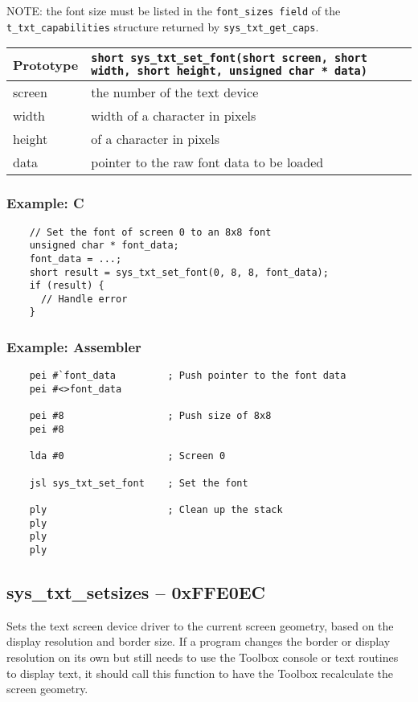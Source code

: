 NOTE: the font size must be listed in the \verb+font_sizes field+ of the \verb+t_txt_capabilities+ structure returned by \verb+sys_txt_get_caps+.

\bigskip

\begin{tabular}{|l||l|} \hline
Prototype & \lstinline!short sys_txt_set_font(short screen, short width, short height, unsigned char * data)! \\ \hline
screen & the number of the text device \\ \hline
width & width of a character in pixels \\ \hline
height & of a character in pixels \\ \hline
data & pointer to the raw font data to be loaded \\ \hline
\end{tabular}

\subsubsection*{Example: C}
\begin{lstlisting}
    // Set the font of screen 0 to an 8x8 font
    unsigned char * font_data;
    font_data = ...;
    short result = sys_txt_set_font(0, 8, 8, font_data);
    if (result) {
      // Handle error
    }    
\end{lstlisting}

\subsubsection*{Example: Assembler}
\begin{verbatim}
    pei #`font_data         ; Push pointer to the font data
    pei #<>font_data

    pei #8                  ; Push size of 8x8
    pei #8

    lda #0                  ; Screen 0

    jsl sys_txt_set_font    ; Set the font

    ply                     ; Clean up the stack
    ply
    ply
    ply
\end{verbatim}


\subsection*{sys\_txt\_setsizes -- 0xFFE0EC}
Sets the text screen device driver to the current screen geometry, based on the display resolution and border size.
If a program changes the border or display resolution on its own but still needs to use the Toolbox console or text routines to display text,
it should call this function to have the Toolbox recalculate the screen geometry.

